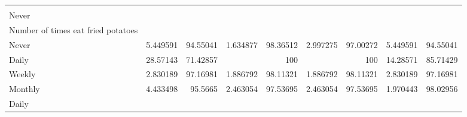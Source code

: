 \documentclass{article}
\begin{document}
\begin{tabular}{lllllllll}
  \multicolumn{1}{r}{} &
  \multicolumn{1}{r}{} &
  \multicolumn{1}{r}{} \\
\multicolumn{1}{l}{\hspace{5em}Never} &
  \multicolumn{1}{|r}{} &
  \multicolumn{1}{r}{} &
  \multicolumn{1}{r}{} &
  \multicolumn{1}{r}{} &
  \multicolumn{1}{r}{} &
  \multicolumn{1}{r}{} &
  \multicolumn{1}{r}{} &
  \multicolumn{1}{r}{} \\
\multicolumn{1}{l}{\hspace{6em}Number of times eat fried potatoes} &
  \multicolumn{1}{|r}{} &
  \multicolumn{1}{r}{} &
  \multicolumn{1}{r}{} &
  \multicolumn{1}{r}{} &
  \multicolumn{1}{r}{} &
  \multicolumn{1}{r}{} &
  \multicolumn{1}{r}{} &
  \multicolumn{1}{r}{} \\
\multicolumn{1}{l}{\hspace{7em}Never} &
  \multicolumn{1}{|r}{5.449591} &
  \multicolumn{1}{r}{94.55041} &
  \multicolumn{1}{r}{1.634877} &
  \multicolumn{1}{r}{98.36512} &
  \multicolumn{1}{r}{2.997275} &
  \multicolumn{1}{r}{97.00272} &
  \multicolumn{1}{r}{5.449591} &
  \multicolumn{1}{r}{94.55041} \\
\multicolumn{1}{l}{\hspace{7em}Daily} &
  \multicolumn{1}{|r}{28.57143} &
  \multicolumn{1}{r}{71.42857} &
  \multicolumn{1}{r}{} &
  \multicolumn{1}{r}{100} &
  \multicolumn{1}{r}{} &
  \multicolumn{1}{r}{100} &
  \multicolumn{1}{r}{14.28571} &
  \multicolumn{1}{r}{85.71429} \\
\multicolumn{1}{l}{\hspace{7em}Weekly} &
  \multicolumn{1}{|r}{2.830189} &
  \multicolumn{1}{r}{97.16981} &
  \multicolumn{1}{r}{1.886792} &
  \multicolumn{1}{r}{98.11321} &
  \multicolumn{1}{r}{1.886792} &
  \multicolumn{1}{r}{98.11321} &
  \multicolumn{1}{r}{2.830189} &
  \multicolumn{1}{r}{97.16981} \\
\multicolumn{1}{l}{\hspace{7em}Monthly} &
  \multicolumn{1}{|r}{4.433498} &
  \multicolumn{1}{r}{95.5665} &
  \multicolumn{1}{r}{2.463054} &
  \multicolumn{1}{r}{97.53695} &
  \multicolumn{1}{r}{2.463054} &
  \multicolumn{1}{r}{97.53695} &
  \multicolumn{1}{r}{1.970443} &
  \multicolumn{1}{r}{98.02956} \\
\multicolumn{1}{l}{\hspace{5em}Daily} &
  \multicolumn{1}{|r}{} &
  \multicolumn{1}{r}{} &
  \multicolumn{1}{r}{} &
  \multicolumn{1}{r}{} &
  \multicolumn{1}{r}{} &
  \multicolumn{1}{r}{} &
  \multicolumn{1}{r}{} &
  \multicolumn{1}{r}{} \\

\end{tabular}
\end{document}
